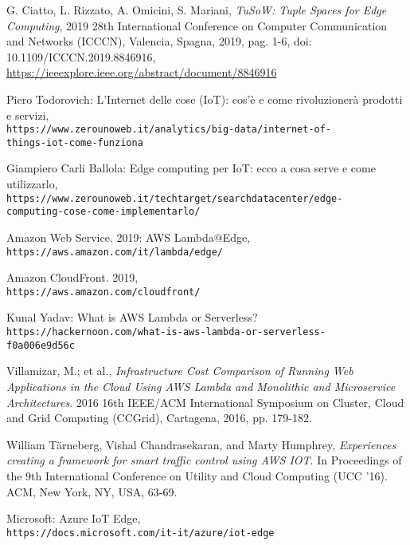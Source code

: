 \documentclass[a4paper,12pt,oneside]{book}
\begin{document}
\begin{thebibliography}{9}
	G. Ciatto, L. Rizzato, A. Omicini, S. Mariani, \textit{TuSoW: Tuple Spaces for Edge Computing}, 2019 28th International Conference on Computer Communication and Networks (ICCCN), Valencia, Spagna, 2019, pag. 1-6, doi: 10.1109/ICCCN.2019.8846916,
	\\\url{https://ieeexplore.ieee.org/abstract/document/8846916}
	
	
	Piero Todorovich: L’Internet delle cose (IoT): cos’è e come rivoluzionerà prodotti e servizi,
	\\\texttt{https://www.zerounoweb.it/analytics/big-data/internet-of-\\things-iot-come-funziona}
	
	Giampiero Carli Ballola: Edge computing per IoT: ecco a cosa serve e come utilizzarlo,
	\\\texttt{https://www.zerounoweb.it/techtarget/searchdatacenter/edge-\\computing-cose-come-implementarlo/}
		
	Amazon Web Service. 2019: AWS Lambda@Edge,
	\\\texttt{https://aws.amazon.com/it/lambda/edge/}
	
	Amazon CloudFront. 2019,
	\\\texttt{https://aws.amazon.com/cloudfront/}
	
	Kunal Yadav: What is AWS Lambda or Serverless?
	\\\texttt{https://hackernoon.com/what-is-aws-lambda-or-serverless-\\f0a006e9d56c}

	
	Villamizar, M.; et al., 
	\textit{Infrastructure Cost Comparison of Running Web Applications in the Cloud Using AWS Lambda and Monolithic and Microservice Architectures}. 
	2016 16th IEEE/ACM International Symposium on Cluster, Cloud and Grid Computing (CCGrid), Cartagena, 2016, pp. 179-182.
	
	William Tärneberg, Vishal Chandrasekaran, and Marty Humphrey, 
	\textit{Experiences creating a framework for smart traffic control using AWS IOT}. 
	In Proceedings of the 9th International Conference on Utility and Cloud Computing (UCC '16). ACM, New York, NY, USA, 63-69.
	
	Microsoft: Azure IoT Edge,
	\\\texttt{https://docs.microsoft.com/it-it/azure/iot-edge}
	

\end{thebibliography}
\end{document}
